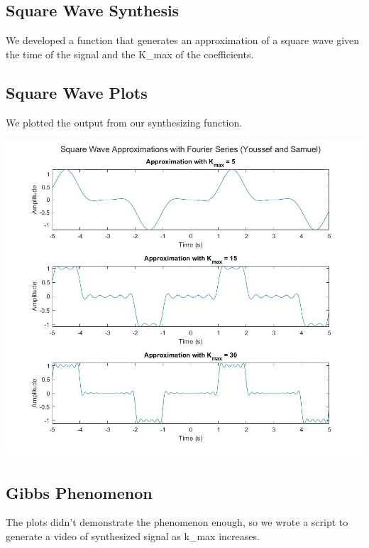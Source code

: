 \documentclass[11pt]{article}
\begin{document}


\subsection{Square Wave Synthesis}

We developed a function that generates an approximation of a square wave
given the time of the signal and the K\_{max} of the coefficients.



\subsection{Square Wave Plots}

We plotted the output from our synthesizing function.

\includegraphics[width=\textwidth]{squarewaves.png}



\subsection{Gibbs Phenomenon}

The plots didn't demonstrate the phenomenon enough,
so we wrote a script to generate a video of synthesized signal
as k\_{max} increases.


\end{document}
